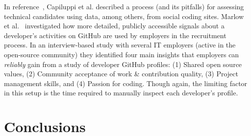 \documentclass[conference]{IEEEtran}
\begin{document}
In reference~\cite{Capil13}, Capiluppi et al. described a process (and its
pitfalls) for assessing technical candidates using data, among others, from
social coding sites. Marlow et al.~\cite{Marlow:2013:ATS:2441776.2441794}
investigated how more detailed, publicly accessible signals about a developer's
activities on GitHub are used by employers in the recruitment process. In an
interview-based study with several IT employers (active in the open-source
community) they identified four main insights that employers can \emph{reliably}
gain from a study of developer GitHub profiles: (1) Shared open source values,
(2) Community acceptance of work \& contribution quality, (3) Project management
skills, and (4) Passion for coding. Though again, the limiting factor in this
setup is the time required to manually inspect each developer's profile.

\section{Conclusions}





\end{document}
